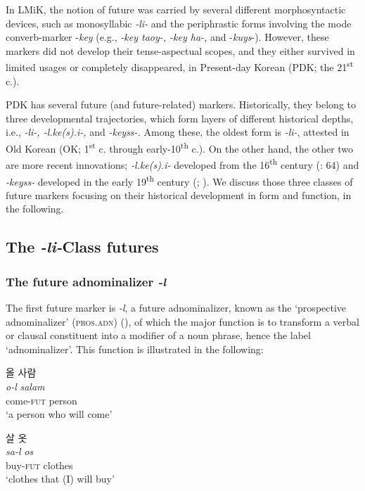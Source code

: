\documentclass[output=paper,colorlinks,citecolor=brown]{langscibook}
\begin{document}
\largerpage[1]

In LMiK, the notion of future was carried by several different morphosyntactic devices, such as monosyllabic \textit{-li-} and the periphrastic forms involving the mode converb-marker -\textit{key} (e.g., \textit{-key taoy-, -key ha-,} and -\textit{kuys}-). However, these markers did not develop their tense-aspectual scopes, and they either survived in limited usages or completely disappeared, in Present-day Korean (PDK; the 21\textsuperscript{st} c.).

PDK has several future (and future-related) markers. Historically, they belong to three developmental trajectories, which form layers of different historical depths, i.e., \textit{-li-, -l.ke(s).i-,} and \textit{-keyss-.} Among these, the oldest form is \textit{-li-}, attested in Old Korean (OK; 1\textsuperscript{st} c. through early-10\textsuperscript{th} c.). On the other hand, the other two are more recent innovations; \textit{-l.ke(s).i-} developed from the 16\textsuperscript{th} century (\cite{Lee1997}: 64) and \textit{-keyss-} developed in the early 19\textsuperscript{th} century (\cite{Huh1987}; \cite{Rhee1996}). We discuss those three classes of future markers focusing on their historical development in form and function, in the following. 

\subsection{The \textit{-li-}Class futures}
\subsubsection{The future adnominalizer \textit{-l}} \label{sec:2.1.1}

The first future marker is \textit{-l}, a future adnominalizer, known as the ‘prospective adnominalizer’ (\textsc{pros.adn}) (\cite{Rhee2012b}), of which the major function is to transform a verbal or clausal constituent into a modifier of a noun phrase, hence the label ‘adnominalizer’. This function is illustrated in the following:


\ea \label{ex:rhee:1}
    \ea \label{ex:rhee:1a} \textkorean{올 사람}\\
    \gll \textit{o-l} \textit{salam}\\
     come-\textsc{fut} person\\
    \glt `a person who will come'

    \ex \label{ex:rhee:1b} \textkorean{살 옷}\\
    \gll \textit{sa-l} \textit{os}\\
     buy-\textsc{fut} clothes\\
    \glt `clothes that (I) will buy'
    \z
\z
\end{document}
